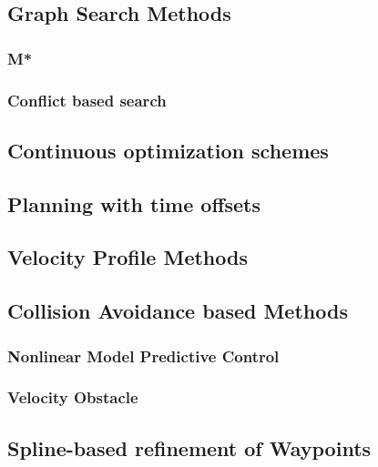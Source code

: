  \subsection{Graph Search Methods}
 \subsubsection{M*}
 \subsubsection{Conflict based search}
 
 \subsection{Continuous optimization schemes}

 \subsection{Planning with time offsets}

 \subsection{Velocity Profile Methods}

 \subsection{Collision Avoidance based Methods}
 \subsubsection{Nonlinear Model Predictive Control}
 \subsubsection{Velocity Obstacle}

 \subsection{Spline-based refinement of Waypoints}
